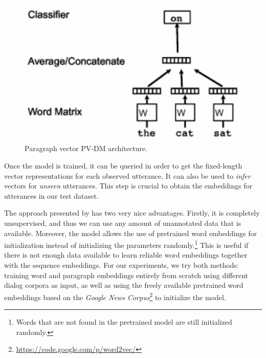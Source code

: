 
\begin{figure}
\centering
\begin{minipage}{.3\textwidth}
\includegraphics[width=1\textwidth]{img/par2vec_arq}
\caption{Paragraph vector PV-DM architecture.}
\label{fig:p2v_arq}
\end{minipage}
\end{figure}

Once the model is trained, it can be queried in order to get the fixed-length vector representations for each observed utterance.
It can also be used to \emph{infer} vectors for \emph{unseen} utterances.
This step is crucial to obtain the embeddings for utterances in our test dataset.

The approach presented by  has two very nice advantages.
Firstly, it is completely unsupervised, and thus we can use any amount of unannotated data that is available.
Moreover, the model allows the use of pretrained word embeddings for initialization instead of initializing the parameters randomly.\footnote{Words that are not found in the pretrained model are still initialized randomly.}
This is useful if there is not enough data available to learn reliable word embeddings together with the sequence embeddings.
For our experiments, we try both methods: training word and paragraph embeddings entirely from scratch using different dialog corpora as input, as well as using the freely available pretrained word embeddings based on the \emph{Google News Corpus}\footnote{\url{https://code.google.com/p/word2vec/}} to initialize the model.
